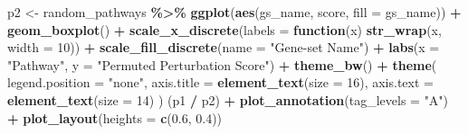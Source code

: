 \documentclass[9pt,a4paper,]{extarticle}
\newenvironment{Shaded}{\begin{snugshade}}{\end{snugshade}}
\newcommand{\AttributeTok}[1]{\textcolor[rgb]{0.13,0.29,0.53}{#1}}
\newcommand{\ControlFlowTok}[1]{\textcolor[rgb]{0.13,0.29,0.53}{\textbf{#1}}}
\newcommand{\DecValTok}[1]{\textcolor[rgb]{0.00,0.00,0.81}{#1}}
\newcommand{\FloatTok}[1]{\textcolor[rgb]{0.00,0.00,0.81}{#1}}
\newcommand{\FunctionTok}[1]{\textcolor[rgb]{0.13,0.29,0.53}{\textbf{#1}}}
\newcommand{\NormalTok}[1]{#1}
\newcommand{\OtherTok}[1]{\textcolor[rgb]{0.56,0.35,0.01}{#1}}
\newcommand{\SpecialCharTok}[1]{\textcolor[rgb]{0.81,0.36,0.00}{\textbf{#1}}}
\newcommand{\StringTok}[1]{\textcolor[rgb]{0.31,0.60,0.02}{#1}}
\begin{document}
\begin{Shaded}
\begin{Highlighting}[]
\NormalTok{p2 }\OtherTok{\textless{}{-}}\NormalTok{ random\_pathways }\SpecialCharTok{\%\textgreater{}\%}
  \FunctionTok{ggplot}\NormalTok{(}\FunctionTok{aes}\NormalTok{(gs\_name, score, }\AttributeTok{fill =}\NormalTok{ gs\_name)) }\SpecialCharTok{+}
  \FunctionTok{geom\_boxplot}\NormalTok{() }\SpecialCharTok{+}
  \FunctionTok{scale\_x\_discrete}\NormalTok{(}\AttributeTok{labels =} \ControlFlowTok{function}\NormalTok{(x) }\FunctionTok{str\_wrap}\NormalTok{(x, }\AttributeTok{width =} \DecValTok{10}\NormalTok{)) }\SpecialCharTok{+}
  \FunctionTok{scale\_fill\_discrete}\NormalTok{(}\AttributeTok{name =} \StringTok{"Gene{-}set Name"}\NormalTok{) }\SpecialCharTok{+} 
  \FunctionTok{labs}\NormalTok{(}\AttributeTok{x =} \StringTok{"Pathway"}\NormalTok{, }\AttributeTok{y =} \StringTok{"Permuted Perturbation Score"}\NormalTok{) }\SpecialCharTok{+}
  \FunctionTok{theme\_bw}\NormalTok{() }\SpecialCharTok{+} 
  \FunctionTok{theme}\NormalTok{(}
    \AttributeTok{legend.position =} \StringTok{"none"}\NormalTok{, }
    \AttributeTok{axis.title =} \FunctionTok{element\_text}\NormalTok{(}\AttributeTok{size =} \DecValTok{16}\NormalTok{), }
    \AttributeTok{axis.text =} \FunctionTok{element\_text}\NormalTok{(}\AttributeTok{size =} \DecValTok{14}\NormalTok{)}
\NormalTok{  )}
\NormalTok{(p1 }\SpecialCharTok{/}\NormalTok{ p2) }\SpecialCharTok{+}
  \FunctionTok{plot\_annotation}\NormalTok{(}\AttributeTok{tag\_levels =} \StringTok{"A"}\NormalTok{) }\SpecialCharTok{+}
  \FunctionTok{plot\_layout}\NormalTok{(}\AttributeTok{heights =} \FunctionTok{c}\NormalTok{(}\FloatTok{0.6}\NormalTok{, }\FloatTok{0.4}\NormalTok{))}
\end{Highlighting}
\end{Shaded}
\end{document}
